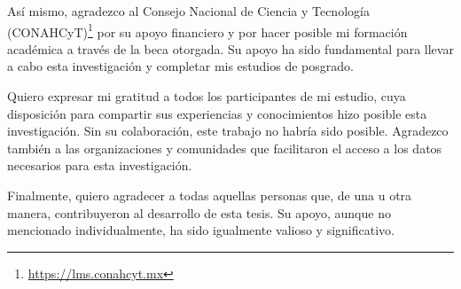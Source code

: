 Así mismo, agradezco al Consejo Nacional de Ciencia y Tecnología (CONAHCyT)\footnote{\url{https://lms.conahcyt.mx}}
por su apoyo financiero y por hacer posible mi formación académica a través de la beca otorgada.
Su apoyo ha sido fundamental para llevar a cabo esta investigación y completar mis estudios de posgrado.

Quiero expresar mi gratitud a todos los participantes de mi estudio, cuya disposición para compartir
sus experiencias y conocimientos hizo posible esta investigación. Sin su colaboración, este trabajo
no habría sido posible. Agradezco también a las organizaciones y comunidades que facilitaron el
acceso a los datos necesarios para esta investigación.

Finalmente, quiero agradecer a todas aquellas personas que, de una u otra manera, contribuyeron al
desarrollo de esta tesis. Su apoyo, aunque no mencionado individualmente, ha sido igualmente valioso
y significativo.
